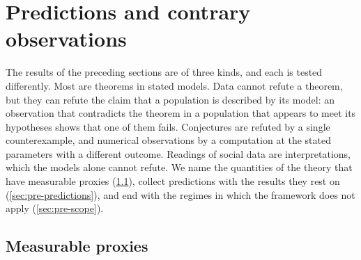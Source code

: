 \section{Predictions and contrary observations}\label{sec:pre}

The results of the preceding sections are of three kinds, and each is tested differently. Most are theorems in stated models. Data cannot refute a theorem, but they can refute the claim that a population is described by its model: an observation that contradicts the theorem in a population that appears to meet its hypotheses shows that one of them fails. Conjectures are refuted by a single counterexample, and numerical observations by a computation at the stated parameters with a different outcome. Readings of social data are interpretations, which the models alone cannot refute. We name the quantities of the theory that have measurable proxies (\cref{sec:pre-proxies}), collect predictions with the results they rest on (\cref{sec:pre-predictions}), and end with the regimes in which the framework does not apply (\cref{sec:pre-scope}).

\subsection{Measurable proxies}\label{sec:pre-proxies}

